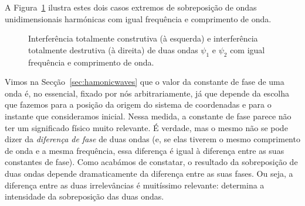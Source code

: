 A Figura~\ref{fig:icd} ilustra estes dois casos extremos de sobreposição de ondas
unidimensionais harmónicas com igual frequência e comprimento de onda.
\begin{figure}[htb]
  {\centering
    \par
  }
  \caption{Interferência totalmente construtiva (à esquerda) e interferência
  totalmente destrutiva (à direita) de duas ondas $\psi_1$ e $\psi_2$ com igual
  frequência e comprimento de onda.\label{fig:icd}}
\end{figure}

Vimos na Secção~\ref{sec:hamonicwaves} que o valor da constante de fase de uma
onda é, no essencial, fixado por nós arbitrariamente, já que depende da escolha
que fazemos para a posição da origem do sistema de coordenadas e para o instante
que consideramos inicial.  Nessa medida, a constante de fase parece não ter um
significado físico muito relevante. É verdade, mas o mesmo não se pode dizer da
\emph{diferença de fase} de duas ondas (e, se elas tiverem o mesmo comprimento
de onda e a mesma frequência, essa diferença é igual à diferença entre as suas
constantes de fase). Como acabámos de constatar, o resultado da sobreposição de
duas ondas depende dramaticamente da diferença entre as suas fases. Ou seja, a
diferença entre as duas irrelevâncias é muitíssimo relevante: determina a
intensidade da sobreposição das duas ondas.


